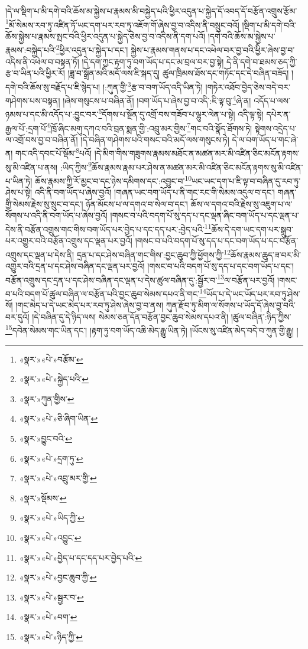 །དེ་ལ་སྡིག་པ་མི་དགེ་བའི་ཆོས་མ་སྐྱེས་པ་རྣམས་མི་བསྐྱེད་པའི་ཕྱིར་འདུན་པ་སྐྱེད་དོ་འབད་དོ་བརྩོན་འགྲུས་རྩོམ་\footnote{«སྣར་»«པེ་»བརྩོམ་}མོ་སེམས་རབ་ཏུ་འཛིན་ཏོ་ཡང་དག་པར་རབ་ཏུ་འཇོག་གོ་ཞེས་བྱ་བ་འདིས་ནི་བསྲུང་བའོ། །སྡིག་པ་མི་དགེ་བའི་ཆོས་སྐྱེས་པ་རྣམས་སྤང་བའི་ཕྱིར་འདུན་པ་སྐྱེད་ཅེས་བྱ་བ་འདིས་ནི་དག་པའོ། །དགེ་བའི་ཆོས་མ་སྐྱེས་པ་རྣམས་:བསྐྱེད་པའི་\footnote{«སྣར་»«པེ་»སྐྱེད་པའི་}ཕྱིར་འདུན་པ་སྐྱེད་པ་དང་། སྐྱེས་པ་རྣམས་གནས་པ་དང་འཕེལ་བར་བྱ་བའི་ཕྱིར་ཞེས་བྱ་བ་འདིས་ནི་འཕེལ་བ་བསྟན་ཏོ། །དེ་དག་ཀྱང་རྟག་ཏུ་བག་ཡོད་པ་དང་མ་བྲལ་བར་བྱ་སྟེ། དེ་ནི་དགེ་བ་ཐམས་ཅད་ཀྱི་རྩ་བ་ཡིན་པའི་ཕྱིར་རོ། །ཟླ་བ་སྒྲོན་མའི་མདོ་ལས་ཇི་སྐད་དུ། ཚུལ་ཁྲིམས་ཐོས་དང་གཏོང་དང་དེ་བཞིན་བཟོད། །དགེ་བའི་ཆོས་སུ་བརྗོད་པ་ཇི་སྙེད་པ། །:ཀུན་གྱི་\footnote{«སྣར་»ཀུན་གྱིས་}རྩ་བ་བག་ཡོད་འདི་ཡིན་ཏེ། །གཏེར་འཐོབ་བྱེད་ཅེས་བདེ་བར་གཤེགས་པས་བསྟན། །ཞེས་གསུངས་པ་བཞིན་ནོ། །བག་ཡོད་པ་ཞེས་བྱ་བ་འདི་:ཇི་ལྟ་བུ་\footnote{«སྣར་»«པེ་»ཅི་ཞིག་ཡིན་}ཞེ་ན། འདོད་པ་ལས་ཉམས་པ་དང་མི་འདོད་པ་:བྱུང་བར་\footnote{«སྣར་»བྱུང་བའི་}དོགས་པ་སྔོན་དུ་འགྲོ་བས་གཟོབ་པ་ལྷུར་ལེན་པ་སྟེ། འདི་ལྟ་སྟེ། དཔེར་ན་རྒྱལ་པོ་:དྲག་པོ་\footnote{«སྣར་»«པེ་»དྲག་ཏུ་}ཁྲོ་ཞིང་མགུ་དཀའ་བའི་བྲན་སྨན་གྱི་:འབྲུ་མར་གྱིས་\footnote{«སྣར་»«པེ་»འབྲུ་མར་གྱི་}གང་བའི་སྣོད་ཐོགས་ཏེ། སྟེགས་འདྲེད་པ་ལ་འགྲོ་བས་བྱ་བ་བཞིན་ནོ། །དེ་བཞིན་གཤེགས་པའི་གསང་བའི་མདོ་ལས་གསུངས་ཏེ། དེ་ལ་བག་ཡོད་པ་གང་ཞེ་ན། གང་འདི་དབང་པོ་སྡོམ་\footnote{«སྣར་»སྡོམས་}པའོ། །དེ་མིག་གིས་གཟུགས་རྣམས་མཐོང་ན་མཚན་མར་མི་འཛིན་ཅིང་མངོན་རྟགས་སུ་མི་འཛིན་པ་ནས། :ཡིད་ཀྱིས་\footnote{«སྣར་»«པེ་»ཡིད་ཀྱི་}ཆོས་རྣམས་རྣམ་པར་ཤེས་ན་མཚན་མར་མི་འཛིན་ཅིང་མངོན་རྟགས་སུ་མི་འཛིན་པ་ཡིན་ཏེ། ཆོས་རྣམས་ཀྱི་རོ་མྱང་བ་དང་ཉེས་དམིགས་དང་:འབྱུང་བ་\footnote{«སྣར་»«པེ་»འབྱུང་}ཡང་ཡང་དག་པ་ཇི་ལྟ་བ་བཞིན་དུ་རབ་ཏུ་ཤེས་པ་སྟེ། འདི་ནི་བག་ཡོད་པ་ཞེས་བྱའོ། །གཞན་ཡང་བག་ཡོད་པ་ནི་གང་རང་གི་སེམས་འདུལ་བ་དང་། གཞན་གྱི་སེམས་རྗེས་སུ་སྲུང་བ་དང་། ཉོན་མོངས་པ་ལ་དགའ་བ་སེལ་བ་དང་། ཆོས་ལ་དགའ་བའི་རྗེས་སུ་འཇུག་པ་ལ་སོགས་པ་འདི་ནི་བག་ཡོད་པ་ཞེས་བྱའོ། །གསང་བ་པའི་བདག་པོ་སུ་དད་པ་དང་ལྡན་ཞིང་བག་ཡོད་པ་དང་ལྡན་པ་དེས་ནི་བརྩོན་འགྲུས་གང་གིས་བག་ཡོད་པར་བྱེད་པ་དང་དད་པར་:བྱེད་པའི་\footnote{«སྣར་»«པེ་»བྱེད་པ་དང་དད་པར་བྱེད་པའི་}ཆོས་དེ་དག་ཡང་དག་པར་སྒྲུབ་པར་འགྱུར་བའི་བརྩོན་འགྲུས་དང་ལྡན་པར་བྱའོ། །གསང་བ་པའི་བདག་པོ་སུ་དད་པ་དང་བག་ཡོད་པ་དང་བརྩོན་འགྲུས་དང་ལྡན་པ་དེས་ནི། དྲན་པ་དང་ཤེས་བཞིན་གང་གིས་:བྱང་ཆུབ་ཀྱི་ཕྱོགས་ཀྱི་\footnote{«སྣར་»«པེ་»བྱང་ཆུབ་ཀྱི་}ཆོས་རྣམས་ཆུད་ཟ་བར་མི་འགྱུར་བའི་དྲན་པ་དང་ཤེས་བཞིན་དང་ལྡན་པར་བྱའོ། །གསང་བ་པའི་བདག་པོ་སུ་དད་པ་དང་བག་ཡོད་པ་དང་། བརྩོན་འགྲུས་དང་དྲན་པ་དང་ཤེས་བཞིན་དང་ལྡན་པ་དེས་ཚུལ་བཞིན་དུ་:སྦྱོར་བ་\footnote{«སྣར་»«པེ་»སྦྱར་བ་}ལ་བརྩོན་པར་བྱའོ། །གསང་བ་པའི་བདག་པོ་ཚུལ་བཞིན་ལ་བརྩོན་པའི་བྱང་ཆུབ་སེམས་དཔའ་ནི་གང་\footnote{«སྣར་»«པེ་»བག་}ཡོད་པ་དེ་ཡང་ཡོད་པར་རབ་ཏུ་ཤེས་སོ། །གང་མེད་པ་དེ་ཡང་མེད་པར་རབ་ཏུ་ཤེས་ཞེས་བྱ་བ་ནས། ཀུན་རྫོབ་ཏུ་མིག་ལ་སོགས་པ་ཡོད་དོ་ཞེས་བྱ་བའི་བར་དུའོ། །དེ་བཞིན་དུ་དེ་ཉིད་ལས། སེམས་ཅན་དོན་བརྩོན་བྱང་ཆུབ་སེམས་དཔའ་ནི། །ཚུལ་བཞིན་:ཉིད་ཀྱིས་\footnote{«སྣར་»«པེ་»ཉིད་ཀྱི་}དབེན་སེམས་གང་ཡིན་དང་། །རྟག་ཏུ་བག་ཡོད་འཆི་མེད་རྒྱུ་ཡིན་ཏེ། །ཡོངས་སུ་འཛིན་མེད་བདེ་བ་ཀུན་གྱི་རྒྱུ། །
